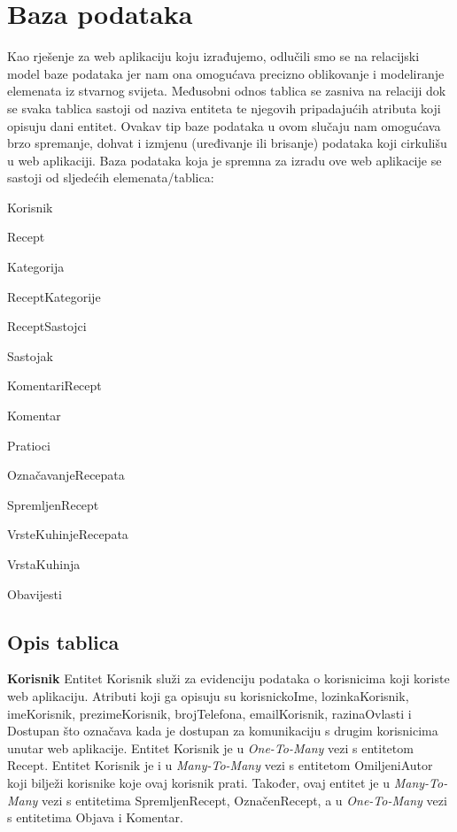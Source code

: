 \eject





\section{Baza podataka}


\textnormal{Kao rješenje za web aplikaciju koju izrađujemo, odlučili smo se na relacijski model baze podataka jer nam ona omogućava precizno oblikovanje i modeliranje elemenata iz stvarnog svijeta. Međusobni odnos tablica se zasniva na relaciji dok se svaka tablica sastoji od naziva entiteta te njegovih pripadajućih atributa koji opisuju dani entitet. Ovakav tip baze podataka u ovom slučaju nam omogućava brzo spremanje, dohvat i izmjenu (uređivanje ili brisanje) podataka koji cirkulišu u web aplikaciji. Baza podataka koja je spremna za izradu ove web aplikacije se sastoji od sljedećih elemenata/tablica:}

\begin{packed_item}

	\item Korisnik
	\item Recept
	\item Kategorija
	\item ReceptKategorije
	\item ReceptSastojci
	\item Sastojak
	\item KomentariRecept
	\item Komentar
	\item Pratioci
	\item OznačavanjeRecepata
	\item SpremljenRecept
	\item VrsteKuhinjeRecepata
	\item VrstaKuhinja
	\item Obavijesti

\end{packed_item}

\eject

\subsection{Opis tablica}


\textnormal{\textbf{Korisnik}		Entitet Korisnik služi za evidenciju podataka o korisnicima koji koriste web aplikaciju. Atributi koji ga opisuju su korisnickoIme, lozinkaKorisnik, imeKorisnik, prezimeKorisnik, brojTelefona, emailKorisnik, razinaOvlasti i Dostupan što označava kada je dostupan za komunikaciju s drugim korisnicima unutar web aplikacije. Entitet Korisnik je u \textit{One-To-Many} vezi s entitetom Recept. Entitet Korisnik je i u \textit{Many-To-Many} vezi s entitetom OmiljeniAutor koji bilježi korisnike koje ovaj korisnik prati. Također, ovaj entitet je u \textit{Many-To-Many} vezi s entitetima SpremljenRecept, OznačenRecept, a u \textit{One-To-Many} vezi s entitetima Objava i Komentar.}



